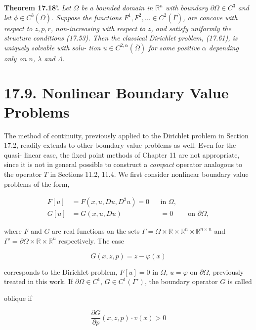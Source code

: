 \textbf{Theorem 17.18'.} \textit{Let $\Omega$ be a bounded domain in $\mathbb{R}^n$ with boundary $\partial\Omega \in C^3$ and let
$\phi \in C^3(\overline{\Omega})$. Suppose the functions $F^1, F^2, \ldots \in C^2(\overline{\Gamma})$, are concave with respect to
$z, p, r$, non-increasing with respect to $z$, and satisfy uniformly the structure conditions
(17.53). Then the classical Dirichlet problem, (17.61), is uniquely solvable with solu-
tion $u \in C^{2,\alpha}(\overline{\Omega})$ for some positive $\alpha$ depending only on $n$, $\lambda$ and $\Lambda$.}

\section*{17.9. Nonlinear Boundary Value Problems}

The method of continuity, previously applied to the Dirichlet problem in Section
17.2, readily extends to other boundary value problems as well. Even for the quasi-
linear case, the fixed point methods of Chapter 11 are not appropriate, since it is not
in general possible to construct a \textit{compact} operator analogous to the operator $T$ in
Sections 11.2, 11.4.
    We first consider nonlinear boundary value problems of the form,

\[
\begin{aligned}
F[u] &= F(x,u,Du,D^2u)=0 && \text{in } \Omega, \\
G[u] &= G(x,u,Du) && = 0 && \text{on } \partial\Omega,
\end{aligned}
\tag{17.100}
\]

where $F$ and $G$ are real functions on the sets $\Gamma = \Omega \times \mathbb{R} \times \mathbb{R}^n \times \mathbb{R}^{n\times n}$ and
$\Gamma' = \partial\Omega \times \mathbb{R} \times \mathbb{R}^n$ respectively. The case

\[
G(x,z,p)= z - \varphi(x)
\tag{17.101}
\]

corresponds to the Dirichlet problem, $F[u] = 0$ in $\Omega$, $u = \varphi$ on $\partial\Omega$, previously
treated in this work. If $\partial\Omega \in C^1$, $G \in C^1(\Gamma')$, the boundary operator $G$ is called


oblique if

\begin{equation}
\tag{17.102}
\frac{\partial G}{\partial p}(x,z,p)\cdot v(x) > 0
\end{equation}

